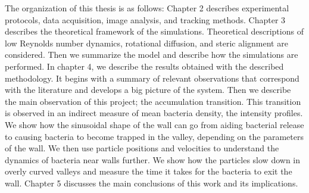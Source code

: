 The organization of this thesis is as follows: Chapter 2 describes experimental protocols, data acquisition, image analysis, and tracking methods. Chapter 3 describes the theoretical framework of the simulations. Theoretical descriptions of low Reynolds number dynamics, rotational diffusion, and steric alignment are considered. Then we summarize the model and describe how the simulations are performed. In chapter 4, we describe the results obtained with the described methodology. It begins with a summary of relevant observations that correspond with the literature and develops a big picture of the system. Then we describe the main observation of this project; the accumulation transition. This transition is observed in an indirect measure of mean bacteria density, the intensity profiles. We show how the sinusoidal shape of the wall can go from aiding bacterial release to causing bacteria to become trapped in the valley, depending on the parameters of the wall. We then use particle positions and velocities to understand the dynamics of bacteria near walls further. We show how the particles slow down in overly curved valleys and measure the time it takes for the bacteria to exit the wall. Chapter 5 discusses the main conclusions of this work and its implications.


